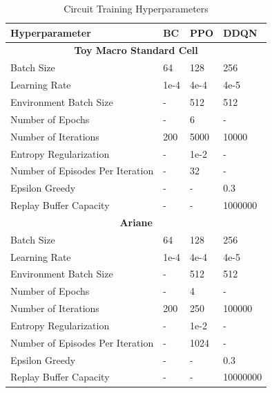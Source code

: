 \begin{table}[H]
\centering
\begin{tabular}{|l|l|l|l|}
\hline
\textbf{Hyperparameter} & \textbf{BC} & \textbf{PPO} & \textbf{DDQN} \\ \hline
\multicolumn{4}{|c|}{\textbf{Toy Macro Standard Cell}} \\ \hline
Batch Size & 64 & 128 & 256 \\ \hline
Learning Rate & 1e-4 & 4e-4 & 4e-5 \\ \hline
Environment Batch Size & - & 512 & 512 \\ \hline
Number of Epochs & - & 6 & - \\ \hline
Number of Iterations & 200 & 5000 & 10000 \\ \hline
Entropy Regularization & - & 1e-2 & - \\ \hline
Number of Episodes Per Iteration & - & 32 & - \\ \hline
Epsilon Greedy & - & - & 0.3 \\ \hline
Replay Buffer Capacity & - & - & 1000000 \\ \hline
\multicolumn{4}{|c|}{\textbf{Ariane}} \\ \hline
Batch Size & 64 & 128 & 256 \\ \hline
Learning Rate & 1e-4 & 4e-4 & 4e-5 \\ \hline
Environment Batch Size & - & 512 & 512 \\ \hline
Number of Epochs & - & 4 & - \\ \hline
Number of Iterations & 200 & 250 & 100000 \\ \hline
Entropy Regularization & - & 1e-2 & - \\ \hline
Number of Episodes Per Iteration & - & 1024 & - \\ \hline
Epsilon Greedy & - & - & 0.3 \\ \hline
Replay Buffer Capacity & - & - & 10000000 \\ \hline
\end{tabular}
\vspace{0.5em}
\caption{Circuit Training Hyperparameters}

\end{table}



